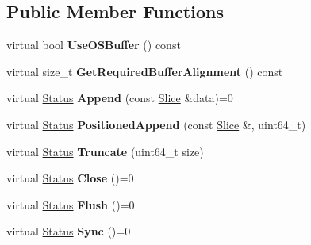 \subsection*{Public Member Functions}
\begin{DoxyCompactItemize}
\item 
virtual bool {\bfseries Use\+O\+S\+Buffer} () const\hypertarget{classrocksdb_1_1WritableFile_a73db9884298866c672096a4a05d9b244}{}\label{classrocksdb_1_1WritableFile_a73db9884298866c672096a4a05d9b244}

\item 
virtual size\+\_\+t {\bfseries Get\+Required\+Buffer\+Alignment} () const\hypertarget{classrocksdb_1_1WritableFile_a4d66e2e24cd3ae8ed5e436d1685d3f4a}{}\label{classrocksdb_1_1WritableFile_a4d66e2e24cd3ae8ed5e436d1685d3f4a}

\item 
virtual \hyperlink{classrocksdb_1_1Status}{Status} {\bfseries Append} (const \hyperlink{classrocksdb_1_1Slice}{Slice} \&data)=0\hypertarget{classrocksdb_1_1WritableFile_aa21c4bf5040156fe25e6580495bab7a9}{}\label{classrocksdb_1_1WritableFile_aa21c4bf5040156fe25e6580495bab7a9}

\item 
virtual \hyperlink{classrocksdb_1_1Status}{Status} {\bfseries Positioned\+Append} (const \hyperlink{classrocksdb_1_1Slice}{Slice} \&, uint64\+\_\+t)\hypertarget{classrocksdb_1_1WritableFile_a52d99e6f4deae278c9104161dee64a4e}{}\label{classrocksdb_1_1WritableFile_a52d99e6f4deae278c9104161dee64a4e}

\item 
virtual \hyperlink{classrocksdb_1_1Status}{Status} {\bfseries Truncate} (uint64\+\_\+t size)\hypertarget{classrocksdb_1_1WritableFile_a46e62aa15109fed6d78c0a41186e49f6}{}\label{classrocksdb_1_1WritableFile_a46e62aa15109fed6d78c0a41186e49f6}

\item 
virtual \hyperlink{classrocksdb_1_1Status}{Status} {\bfseries Close} ()=0\hypertarget{classrocksdb_1_1WritableFile_ade502f1bafbb7db1b916d28ca16cc752}{}\label{classrocksdb_1_1WritableFile_ade502f1bafbb7db1b916d28ca16cc752}

\item 
virtual \hyperlink{classrocksdb_1_1Status}{Status} {\bfseries Flush} ()=0\hypertarget{classrocksdb_1_1WritableFile_aff938f8677f063336848acdfd0446fa8}{}\label{classrocksdb_1_1WritableFile_aff938f8677f063336848acdfd0446fa8}

\item 
virtual \hyperlink{classrocksdb_1_1Status}{Status} {\bfseries Sync} ()=0\hypertarget{classrocksdb_1_1WritableFile_a739dc13d33b6716dce73e44a472ba1dd}{}\label{classrocksdb_1_1WritableFile_a739dc13d33b6716dce73e44a472ba1dd}


\end{DoxyCompactItemize}
